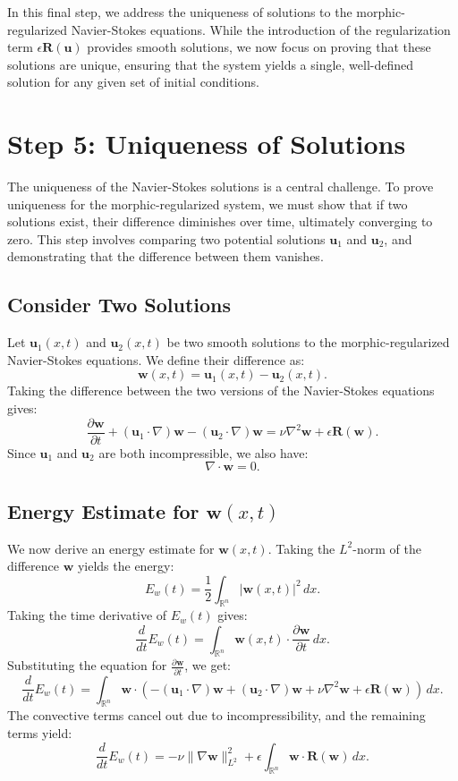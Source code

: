 \documentclass{article}
\begin{document}
In this final step, we address the uniqueness of solutions to the morphic-regularized Navier-Stokes equations. While the introduction of the regularization term \( \epsilon \mathbf{R}(\mathbf{u}) \) provides smooth solutions, we now focus on proving that these solutions are unique, ensuring that the system yields a single, well-defined solution for any given set of initial conditions.

\section*{Step 5: Uniqueness of Solutions}

The uniqueness of the Navier-Stokes solutions is a central challenge. To prove uniqueness for the morphic-regularized system, we must show that if two solutions exist, their difference diminishes over time, ultimately converging to zero. This step involves comparing two potential solutions \( \mathbf{u}_1 \) and \( \mathbf{u}_2 \), and demonstrating that the difference between them vanishes.

\subsection*{Consider Two Solutions}

Let \( \mathbf{u}_1(x,t) \) and \( \mathbf{u}_2(x,t) \) be two smooth solutions to the morphic-regularized Navier-Stokes equations. We define their difference as:
\[
\mathbf{w}(x,t) = \mathbf{u}_1(x,t) - \mathbf{u}_2(x,t).
\]
Taking the difference between the two versions of the Navier-Stokes equations gives:
\[
\frac{\partial \mathbf{w}}{\partial t} + (\mathbf{u}_1 \cdot \nabla) \mathbf{w} - (\mathbf{u}_2 \cdot \nabla) \mathbf{w} = \nu \nabla^2 \mathbf{w} + \epsilon \mathbf{R}(\mathbf{w}).
\]
Since \( \mathbf{u}_1 \) and \( \mathbf{u}_2 \) are both incompressible, we also have:
\[
\nabla \cdot \mathbf{w} = 0.
\]

\subsection*{Energy Estimate for \( \mathbf{w}(x,t) \)}

We now derive an energy estimate for \( \mathbf{w}(x,t) \). Taking the \( L^2 \)-norm of the difference \( \mathbf{w} \) yields the energy:
\[
E_w(t) = \frac{1}{2} \int_{\mathbb{R}^n} |\mathbf{w}(x,t)|^2 \, dx.
\]
Taking the time derivative of \( E_w(t) \) gives:
\[
\frac{d}{dt} E_w(t) = \int_{\mathbb{R}^n} \mathbf{w}(x,t) \cdot \frac{\partial \mathbf{w}}{\partial t} \, dx.
\]
Substituting the equation for \( \frac{\partial \mathbf{w}}{\partial t} \), we get:
\[
\frac{d}{dt} E_w(t) = \int_{\mathbb{R}^n} \mathbf{w} \cdot \left( - (\mathbf{u}_1 \cdot \nabla) \mathbf{w} + (\mathbf{u}_2 \cdot \nabla) \mathbf{w} + \nu \nabla^2 \mathbf{w} + \epsilon \mathbf{R}(\mathbf{w}) \right) \, dx.
\]
The convective terms cancel out due to incompressibility, and the remaining terms yield:
\[
\frac{d}{dt} E_w(t) = - \nu \|\nabla \mathbf{w}\|_{L^2}^2 + \epsilon \int_{\mathbb{R}^n} \mathbf{w} \cdot \mathbf{R}(\mathbf{w}) \, dx.
\]
\end{document}
